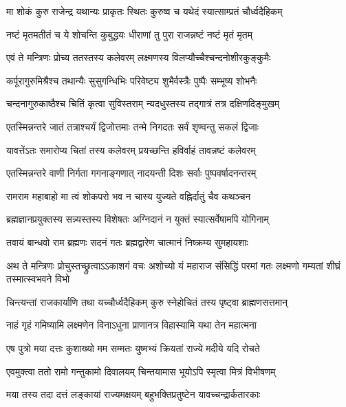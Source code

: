 
\twolineshloka
{मा शोकं कुरु राजेन्द्र यथान्यः प्राकृतः स्थितः}
{कुरुष्व च यथेदं स्यात्साम्प्रतं चौर्ध्वदैहिकम्}%

\twolineshloka
{नष्टं मृतमतीतं च ये शोचन्ति कुबुद्धयः}
{धीराणां तु पुरा राजन्नष्टं नष्टं मृतं मृतम्}%

\twolineshloka
{एवं ते मन्त्रिणः प्रोच्य ततस्तस्य कलेवरम्}
{लक्ष्मणस्य विलप्यौच्चैश्चन्दनोशीरकुङ्कुमैः}%

\twolineshloka
{कर्पूरागुरुमिश्रैश्च तथान्यैः सुसुगन्धिभिः}
{परिवेष्ट्य शुभैर्वस्त्रैः पुष्पैः सम्भूष्य शोभनैः}%

\twolineshloka
{चन्दनागुरुकाष्ठैश्च चितिं कृत्वा सुविस्तराम्}
{न्यदधुस्तस्य तद्गात्रं तत्र दक्षिणदिङ्मुखम्}%

\twolineshloka
{एतस्मिन्नन्तरे जातं तत्राश्चर्यं द्विजोत्तमाः}
{तन्मे निगदतः सर्वं शृण्वन्तु सकलं द्विजाः}%

\twolineshloka
{यावत्तेंऽतः समारोप्य चितां तस्य कलेवरम्}
{प्रयच्छन्ति हविर्वाहं तावन्नष्टं कलेवरम्}%

\twolineshloka
{एतस्मिन्नन्तरे वाणी निर्गता गगनाङ्गणात्}
{नादयन्ती दिशः सर्वाः पुष्पवर्षादनन्तरम्}%

\twolineshloka
{रामराम महाबाहो मा त्वं शोकपरो भव}
{न चास्य युज्यते वह्निर्दातुं चैव कथञ्चन}%

\twolineshloka
{ब्रह्मज्ञानप्रयुक्तस्य सन्न्यस्तस्य विशेषतः}
{अग्निदानं न युक्तं स्यात्सर्वेषामपि योगिनाम्}%

\twolineshloka
{तवायं बान्धवो राम ब्रह्मणः सदनं गतः}
{ब्रह्मद्वारेण चात्मानं निष्क्रम्य सुमहायशाः}%

\threelineshloka
{अथ ते मन्त्रिणः प्रोचुस्तच्छ्रुत्वाऽऽकाशगं वचः}
{अशोच्यो यं महाराज संसिद्धिं परमां गतः}
{लक्ष्मणो गम्यतां शीघ्रं तस्मात्स्वभवने विभो}%

\twolineshloka
{चिन्त्यन्तां राजकार्याणि तथा यच्चौर्ध्वदैहिकम्}
{कुरु स्नेहोचितं तस्य पृष्ट्वा ब्राह्मणसत्तमान्}%


\twolineshloka
{नाहं गृहं गमिष्यामि लक्ष्मणेन विनाऽधुना}
{प्राणानत्र विहास्यामि यथा तेन महात्मना}%

\twolineshloka
{एष पुत्रो मया दत्तः कुशाख्यो मम सम्मतः}
{युष्मभ्यं क्रियतां राज्ये मदीये यदि रोचते}%

\twolineshloka
{एवमुक्त्वा ततो रामो गन्तुकामो दिवालयम्}
{चिन्तयामास भूयोऽपि स्मृत्वा मित्रं विभीषणम्}%

\twolineshloka
{मया तस्य तदा दत्तं लङ्कायां राज्यमक्षयम्}
{बहुभक्तिप्रतुष्टेन यावच्चन्द्रार्कतारकाः}%


